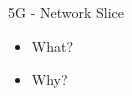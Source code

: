 \begin{frame}{5G - Network Slice}
\begin{itemize}
 \item<1-> What? %
 \item<2-> Why? %
\end{itemize}

\end{frame}
 
